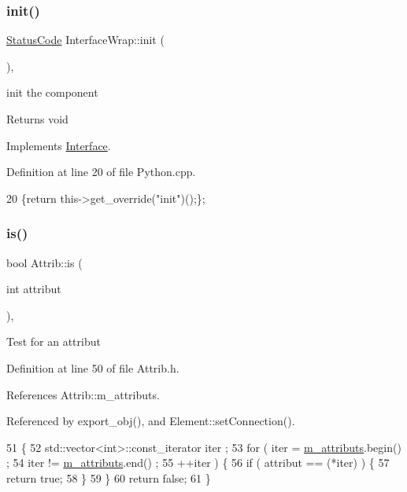 \subsubsection{\texorpdfstring{init()}{init()}}
{\footnotesize\ttfamily \hyperlink{classStatusCode}{Status\+Code} Interface\+Wrap\+::init (\begin{DoxyParamCaption}{ }\end{DoxyParamCaption})\hspace{0.3cm}{\ttfamily [inline]}, {\ttfamily [virtual]}}

init the component

\begin{DoxyReturn}{Returns}
void 
\end{DoxyReturn}


Implements \hyperlink{classInterface_a1d095c113b1e89d1f5f68323856fee63}{Interface}.



Definition at line 20 of file Python.\+cpp.


\begin{DoxyCode}
20 \{\textcolor{keywordflow}{return} this->get\_override(\textcolor{stringliteral}{"init"})();\};
\end{DoxyCode}
\mbox{\label{classAttrib_a704f26af560909ad22065083bb7d4c34}} 
\subsubsection{\texorpdfstring{is()}{is()}}
{\footnotesize\ttfamily bool Attrib\+::is (\begin{DoxyParamCaption}\item[{int}]{attribut }\end{DoxyParamCaption})\hspace{0.3cm}{\ttfamily [inline]}, {\ttfamily [inherited]}}

Test for an attribut 

Definition at line 50 of file Attrib.\+h.



References Attrib\+::m\+\_\+attributs.



Referenced by export\+\_\+obj(), and Element\+::set\+Connection().


\begin{DoxyCode}
51   \{
52     std::vector<int>::const\_iterator iter ;
53     \textcolor{keywordflow}{for} ( iter  = \hyperlink{classAttrib_ac4bd58a0cc6b38a3b711d609a3d3aacc}{m\_attributs}.begin() ;
54           iter != \hyperlink{classAttrib_ac4bd58a0cc6b38a3b711d609a3d3aacc}{m\_attributs}.end()   ;
55           ++iter ) \{
56       \textcolor{keywordflow}{if} ( attribut == (*iter) ) \{
57         \textcolor{keywordflow}{return} \textcolor{keyword}{true};
58       \}
59     \}
60     \textcolor{keywordflow}{return} \textcolor{keyword}{false};
61   \}
\end{DoxyCode}
\mbox{\label{classObject_a58b2d0618c2d08cf2383012611528d97}} 
